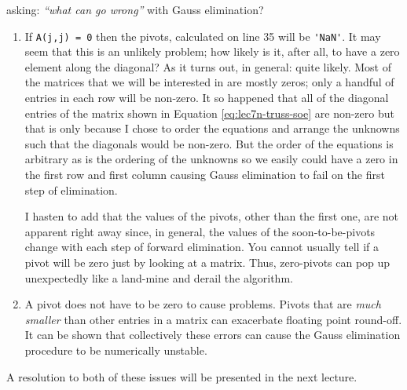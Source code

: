 \vspace{2.0cm}

 asking: \emph{``what can go wrong''} with Gauss elimination?  
\begin{enumerate}
\item If \lstinline[style=myMatlab]{A(j,j) = 0} then the pivots, calculated on line 35 will be \lstinline[style=myMatlab]{'NaN'}.  It may seem that this is an unlikely problem; how likely is it, after all, to have a zero element along the diagonal?  As it turns out, in general: quite likely.  Most of the matrices that we will be interested in are mostly zeros; only a handful of entries in each row will be non-zero.  It so happened that all of the diagonal entries of the matrix shown in Equation \ref{eq:lec7n-truss-soe} are non-zero but that is only because I chose to order the equations and arrange the unknowns such that the diagonals would be non-zero.  But the order of the equations is arbitrary as is the ordering of the unknowns so we easily could have a zero in the first row and first column causing Gauss elimination to fail on the first step of elimination.  

I hasten to add that the values of the pivots, other than the first one, are not apparent right away since, in general, the values of the soon-to-be-pivots change with each step of forward elimination.  You cannot usually tell if a pivot will be zero just by looking at a matrix.  Thus, zero-pivots can pop up unexpectedly like a land-mine and derail the algorithm.

\item A pivot does not have to be zero to cause problems.  Pivots that are \emph{much smaller} than other entries in a matrix can exacerbate floating point round-off.  It can be shown that collectively these errors can cause the Gauss elimination procedure to be numerically unstable.\cite{trefethen2022numerical}
\end{enumerate}  

A resolution to both of these issues will be presented in the next lecture.

